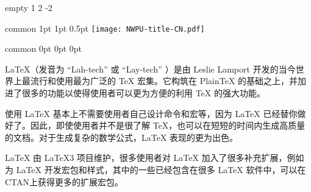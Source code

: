\documentclass[report, twoside, UTF8, AutoFakeBold = 1, AutoFakeSlant, zihao = -4]{config}
\begin{document}
\CoverPage
    {empty} %
    {1} %
    {2} %
    {-2} %


\Header
    {common} %
    {1pt} %
    {1pt} %
    {0.5pt} %
    {} %
    {\texttt{[image: NWPU-title-CN.pdf]}} %
    {} %


\Footer
    {common} %
    {0pt} %
    {0pt} %
    {0pt} %
    {} %
    {\thepage} %
    {} %




\begin{abstractCN}[-2] %

\LaTeX{}（发音为 “Lah-tech” 或 “Lay-tech” ）是由 Leslie Lamport 开发的当今世界上最流行和使用最为广泛的 \TeX{} 宏集。它构筑在 PlainTeX 的基础之上，并加进了很多的功能以使得使用者可以更为方便的利用 \TeX{} 的强大功能。

使用 \LaTeX{} 基本上不需要使用者自己设计命令和宏等，因为 \LaTeX{} 已经替你做好了。因此，即使使用者并不是很了解 \TeX{}，也可以在短短的时间内生成高质量的文档。对于生成复杂的数学公式，\LaTeX{} 表现的更为出色。

\LaTeX{} 由 \LaTeX{3} 项目维护，很多使用者对 \LaTeX{} 加入了很多补充扩展，例如为 \LaTeX{} 开发宏包和样式，其中的一些已经包含在很多 \LaTeX{} 软件中，可以在CTAN上获得更多的扩展宏包。

\def\keywordsCN{关键词1，关键词2，关键词3，关键词4，关键词5}

\end{abstractCN}

\end{document}
